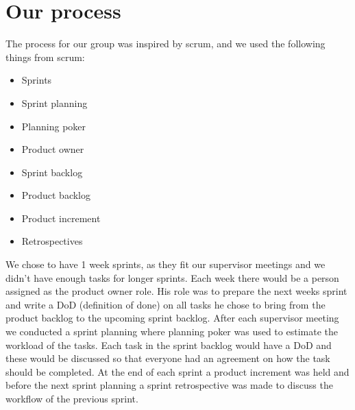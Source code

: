 \section{Our process}
The process for our group was inspired by scrum, and we used the following things from scrum:

\begin{itemize}
    \item Sprints 
    \item Sprint planning 
    \item Planning poker 
    \item Product owner 
    \item Sprint backlog 
    \item Product backlog   
    \item Product increment 
    \item Retrospectives 
\end{itemize}

\noindent
We chose to have 1 week sprints, as they fit our supervisor meetings and we didn't have enough tasks for longer sprints.
Each week there would be a person assigned as the product owner role.
His role was to prepare the next weeks sprint and write a DoD (definition of done) on all tasks he chose to bring from the product backlog to the upcoming sprint backlog.
After each supervisor meeting we conducted a sprint planning where planning poker was used to estimate the workload of the tasks.
Each task in the sprint backlog would have a DoD and these would be discussed so that everyone had an agreement on how the task should be completed.
At the end of each sprint a product increment was held and before the next sprint planning a sprint retrospective was made to discuss the workflow of the previous sprint.
